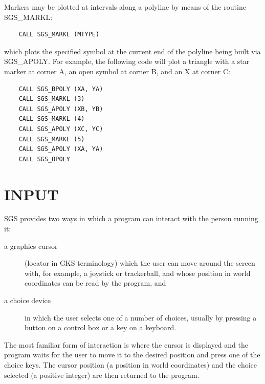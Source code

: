 \documentclass[11pt]{article}
\newcommand{\htmlref}[2]{#1}
\begin{document}
Markers may be plotted at intervals along a polyline by means of the
routine \htmlref{SGS\_MARKL}{SGS_MARKL}:
\begin{verbatim}
    CALL SGS_MARKL (MTYPE)
\end{verbatim}
which plots the specified symbol at the current end of the polyline
being built via \htmlref{SGS\_APOLY}{SGS_APOLY}.  
For example, the following code will
plot a triangle with a star marker at corner A,
an open symbol at corner B, and an X at corner C:
\begin{verbatim}
    CALL SGS_BPOLY (XA, YA)
    CALL SGS_MARKL (3)
    CALL SGS_APOLY (XB, YB)
    CALL SGS_MARKL (4)
    CALL SGS_APOLY (XC, YC)
    CALL SGS_MARKL (5)
    CALL SGS_APOLY (XA, YA)
    CALL SGS_OPOLY
\end{verbatim}

\section {INPUT}

SGS provides two ways in which a program can interact with the person running
it:
\begin{description}
\item[a graphics cursor] (locator in GKS terminology) which
the user can move
around the screen with,
for example, a joystick or trackerball, and whose
position in world coordinates can be read by the program, and
\item[a choice device] in which the user
selects one of a number of choices, usually by pressing
a button on a control
box or a key on a keyboard.
\end{description}
The most familiar form of interaction is where the cursor is displayed and the 
program waits for the user to move it to the desired position and press one
of the choice keys.  The cursor position (a position in world coordinates) and
the choice selected (a positive integer) are then returned to the program.
\end{document}

